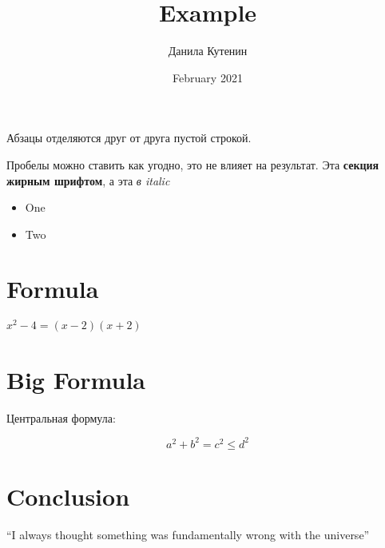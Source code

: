 \documentclass{article}
\title{Example}
\author{Данила Кутенин}
\date{February 2021}
\begin{document}
\maketitle

Абзацы отделяются друг от друга
пустой строкой.

Пробелы можно ставить как угодно,
это не влияет на результат. Эта {\bf секция жирным шрифтом}, а эта {\it в italic}

\begin{itemize}
  \item One
  \item Two
\end{itemize}

\section{Formula}

$x^2 - 4 = (x - 2)(x + 2)$

\section{Big Formula}
Центральная формула:

$$
a^2 + b^2 = c^2 \leq d^2
$$

\section{Conclusion}
``I always thought something was fundamentally wrong with the universe'' \citep{adams1995hitchhiker}



\end{document}
